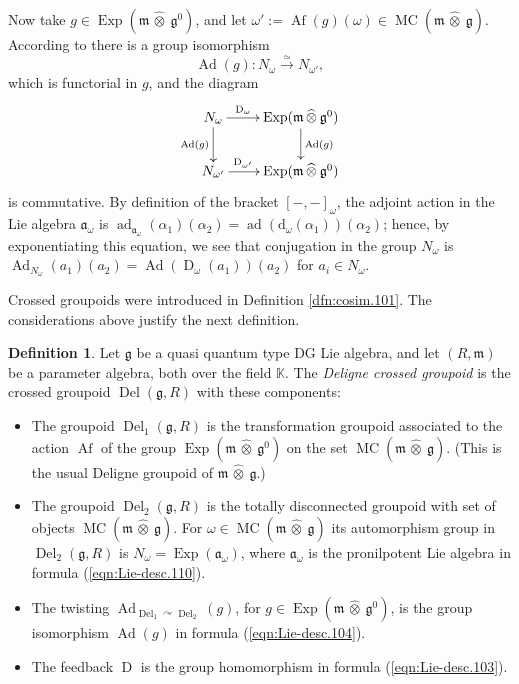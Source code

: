 \documentclass[a4paper, 10pt]{amsart}
\theoremstyle{definition}
\newtheorem{dfn}[equation]{Definition}
\numberwithin{equation}{section}
\newcommand{\iso}{\xrightarrow{\simeq}}
\newcommand{\opn}{\operatorname}
\newcommand{\mfrak}[1]{\mathfrak{#1}}
\newcommand{\mrm}[1]{\mathrm{#1}}
\newcommand{\mbb}[1]{\mathbb{#1}}
\newcommand{\hatotimes}[1]{\, \what{{\otimes}}_{#1} \,}
\newcommand{\hot}{\hatotimes{}}
\newcommand{\what}[1]{\widehat{#1}}
\newcommand{\K}{\mbb{K}}
\newcommand{\g}{\mfrak{g}}
\newcommand{\m}{\mfrak{m}}
\renewcommand{\a}{\mfrak{a}}
\newcommand{\om}{\omega}
\newcommand{\al}{\alpha}
\renewcommand{\d}{\mrm{d}}
\newcommand{\crvar}{\curvearrowright}
\begin{document}
Now take $g \in \opn{Exp}(\m \hot \g^0)$, and let 
$\om' := \opn{Af}(g)(\om) \in \opn{MC}(\m \hot \g)$.
According to \cite[Corollary 6.9]{Ye7} there is a group isomorphism 
\begin{equation} \label{eqn:Lie-desc.104}
\opn{Ad}(g) : N_{\om} \iso N_{\om'} ,
\end{equation}
which is functorial in $g$, and the diagram 
\[ \UseTips \xymatrix @C=5ex @R=5ex {
N_{\om}
\ar[d]_{\opn{Ad}(g)}
\ar[r]^(0.34){\opn{D}_{\om}}
&
\opn{Exp}(\m \hot \g^0)
\ar[d]^{\opn{Ad}(g)}
\\
N_{\om'}
\ar[r]^(0.34){\opn{D}_{\om'}}
&
\opn{Exp}(\m \hot \g^0)
} \]
is commutative. By definition of the bracket $[-,-]_{\om}$, the adjoint
action in the Lie algebra $\a_{\om}$ is
$\opn{ad}_{\a_{\om}}(\al_1)(\al_2) = \opn{ad}(\d_{\om}(\al_1))(\al_2)$; 
hence, by exponentiating this equation, we see that conjugation in the group 
$N_{\om}$ is  
$\opn{Ad}_{N_{\om}}(a_1)(a_2) = \opn{Ad}(\opn{D}_{\om}(a_1))(a_2)$
for $a_i \in N_{\om}$.

Crossed groupoids were introduced in Definition \ref{dfn:cosim.101}.
The considerations above justify the next definition. 

\begin{dfn} \label{dfn:Lie-desc.101}
Let $\g$ be a quasi quantum type DG Lie algebra, and let $(R, \m)$ be a
parameter algebra, both over the field $\K$. The {\em Deligne crossed groupoid} 
is the crossed groupoid $\opn{Del}(\g, R)$ with these
components:
\begin{itemize}
\item The groupoid $\opn{Del}_1(\g, R)$ is the transformation groupoid 
associated to the action $\opn{Af}$ of the group $\opn{Exp}(\m \hot \g^0)$
on the set $\opn{MC}(\m \hot \g)$.
(This is the usual Deligne groupoid of $\m \hot \g$.)

\item  The groupoid $\opn{Del}_2(\g, R)$ is the totally disconnected
groupoid with set of objects $\opn{MC}(\m \hot \g)$.
For $\om \in \opn{MC}(\m \hot \g)$ its automorphism group 
in  $\opn{Del}_2(\g, R)$ is 
$N_{\om} = \opn{Exp}(\a_{\om})$, where $\a_{\om}$ is the pronilpotent Lie
algebra in
formula (\ref{eqn:Lie-desc.110}).

\item The twisting 
$\opn{Ad}_{\opn{Del}_1 \crvar \opn{Del}_2}(g)$,
for $g \in  \opn{Exp}(\m \hot \g^0)$, is the group isomorphism
$\opn{Ad}(g)$ in formula (\ref{eqn:Lie-desc.104}).

\item The feedback $\opn{D}$ is the group homomorphism in formula 
(\ref{eqn:Lie-desc.103}).
\end{itemize}
\end{dfn}
\end{document}

